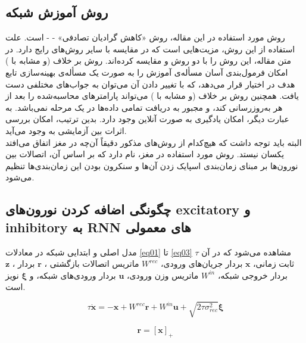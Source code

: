 \documentclass[a4paper]{article}
\begin{document}
\subsection{روش آموزش شبکه}
روش مورد استفاده در این مقاله، روش «کاهش گرادیان تصادفی» -
- 
است. علت استفاده از این روش، مزیت‌هایی است که در مقایسه با سایر روش‌های رایج دارد. در متن مقاله، این روش را با دو روش 
 و  
مقایسه کرده‌اند. روش  بر خلاف  (و مشابه با ) امکان فرمول‌بندی آسان مسأله‌ی آموزش  را به صورت یک مسأله‌ی بهینه‌سازی تابع هدف در اختیار قرار می‌دهد، که با تغییر دادن آن می‌توان به جواب‌های مختلفی دست یافت. همچنین روش  بر خلاف  (و مشابه با ) می‌تواند پارامترهای محاسبه‌شده را بعد از هر  به‌روزرسانی کند، و مجبور به دریافت تمامی داده‌ها در یک مرحله نمی‌باشد. به عبارت دیگر، امکان یادگیری به صورت آنلاین 
وجود دارد. بدین ترتیب، امکان بررسی اثرات بین آزمایشی 
به وجود می‌آید.\\

البته باید توجه داشت که هیچ‌کدام از روش‌های مذکور دقیقاً‌ آن‌چه در مغز اتفاق می‌افتد یکسان نیستد. روش مورد استفاده در مغز، 
نام دارد که بر اساس آن، اتصالات بین نورون‌ها بر مبنای زمان‌بندی اسپایک زدن آن‌ها و سنکرون بودن این زمان‌بندی‌ها تنظیم می‌شود.

\subsection{چگونگی اضافه کردن نورون‌های excitatory و inhibitory به RNN های معمولی}
	مدل اصلی و ابتدایی شبکه در معادلات \ref{eq01} تا \ref{eq03} مشاهده می‌شود که در آن $\tau$ ثابت زمانی، $\mathbf{x}$ بردار جریان‌های ورودی، $W^{rec}$ ماتریس اتصالات بازگشتی
	 ،
	 $\mathbf{r}$ 
	 بردار
	 ، 
	 $\mathbf{z}$
	 بردار خروجی شبکه،
	  $W^{in}$ 	
	 ماتریس وزن ورودی،
	 $\mathbf{u}$
	 بردار ورودی‌های شبکه،
	  و $\boldsymbol{\xi}$ نویز است.
	
	\begin{equation}
			\tau \dot{\mathbf{x}} = -\mathbf{x}+W^{rec}\mathbf{r}+W^{in}\mathbf{u}+\sqrt{2\tau\sigma^2_{rec}}\boldsymbol{\xi} 
		\label{eq01}
	\end{equation}
	
		\begin{equation}
	\mathbf{r} = [\mathbf{x}]_+
	\label{eq02}
	\end{equation}
\end{document}
